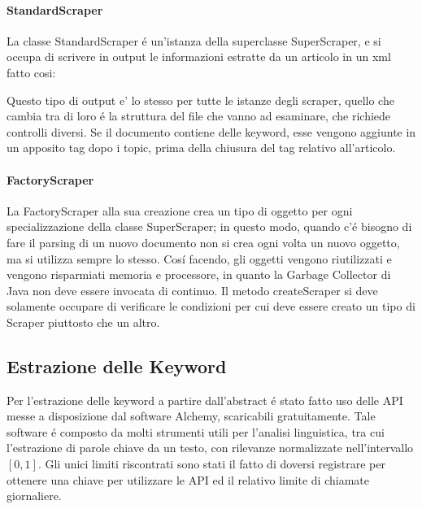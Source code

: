 \documentclass[11pt,twoside,a4paper]{article}
\begin{document}
\paragraph{StandardScraper}
\label{par:standardscraper}
La classe StandardScraper \'e un'istanza della superclasse SuperScraper, e si occupa di scrivere in output le informazioni estratte da un articolo in un xml fatto cosi:



Questo tipo di output e' lo stesso per tutte le istanze degli scraper, quello che cambia tra di loro \'e la struttura del file che vanno ad esaminare, che richiede controlli diversi. Se il documento contiene delle keyword, esse vengono aggiunte in un apposito tag dopo i topic, prima della chiusura del tag relativo all'articolo.



\paragraph{FactoryScraper}
\label{par:factoryscraper}



La FactoryScraper alla sua creazione crea un tipo di oggetto per ogni specializzazione della classe SuperScraper; in questo modo, quando c'\'e bisogno di fare il parsing di un nuovo documento non si crea ogni volta un nuovo oggetto, ma si utilizza sempre lo stesso. Cos\'i facendo, gli oggetti vengono riutilizzati e vengono risparmiati memoria e processore, in quanto la Garbage Collector di Java non deve essere invocata di continuo. Il metodo createScraper si deve solamente occupare di verificare le condizioni per cui deve essere creato un tipo di Scraper piuttosto che un altro.

\subsection{Estrazione delle Keyword}
Per l'estrazione delle keyword a partire dall'abstract \'e stato fatto uso delle API messe a disposizione dal software Alchemy\cite{alchemy}, scaricabili gratuitamente. Tale software \'e composto da molti strumenti utili per l'analisi linguistica, tra cui l'estrazione di parole chiave da un testo, con rilevanze normalizzate nell'intervallo $[0,1]$. Gli unici limiti riscontrati sono stati il fatto di doversi registrare per ottenere una chiave per utilizzare le API ed il relativo limite di chiamate giornaliere.
\end{document}
